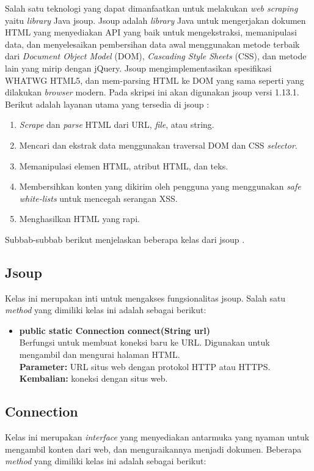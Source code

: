 Salah satu teknologi yang dapat dimanfaatkan untuk melakukan \textit{web scraping} yaitu \textit{library} Java jsoup. Jsoup adalah \textit{library} Java untuk mengerjakan dokumen HTML yang menyediakan API yang baik untuk mengekstraksi, memanipulasi data, dan menyelesaikan pembersihan data awal menggunakan metode terbaik dari \textit{Document Object Model} (DOM), \textit{Cascading Style Sheets} (CSS), dan metode lain yang mirip dengan jQuery. Jsoup mengimplementasikan spesifikasi WHATWG HTML5, dan mem-parsing HTML ke DOM yang sama seperti yang dilakukan \textit{browser} modern. Pada skripsi ini akan digunakan jsoup versi 1.13.1. Berikut adalah layanan utama yang tersedia di jsoup \cite{cokrowibowo}:
\begin{enumerate}
    \item \textit{Scrape} dan \textit{parse} HTML dari URL, \textit{file}, atau string.
    \item Mencari dan ekstrak data menggunakan traversal DOM dan CSS \textit{selector}.
    \item Memanipulasi elemen HTML, atribut HTML, dan teks.
    \item Membersihkan konten yang dikirim oleh pengguna yang menggunakan \textit{safe white-lists} untuk mencegah serangan XSS.
    \item Menghasilkan HTML yang rapi.
\end{enumerate}

Subbab-subbab berikut menjelaskan beberapa kelas dari jsoup \cite{jsoup}.


\subsection{Jsoup}
Kelas ini merupakan inti untuk mengakses fungsionalitas jsoup. Salah satu \textit{method} yang dimiliki kelas ini adalah sebagai berikut:

\begin{itemize}
    \item \textbf{public static Connection connect(String url)}\\
    Berfungsi untuk membuat koneksi baru ke URL. Digunakan untuk mengambil dan mengurai halaman HTML.\\
    \textbf{Parameter:} URL situs web dengan protokol HTTP atau HTTPS.\\
    \textbf{Kembalian:} koneksi dengan situs web.
\end{itemize}


\subsection{Connection}
Kelas ini merupakan \textit{interface} yang menyediakan antarmuka yang nyaman untuk mengambil konten dari web, dan menguraikannya menjadi dokumen. Beberapa \textit{method} yang dimiliki kelas ini adalah sebagai berikut:

